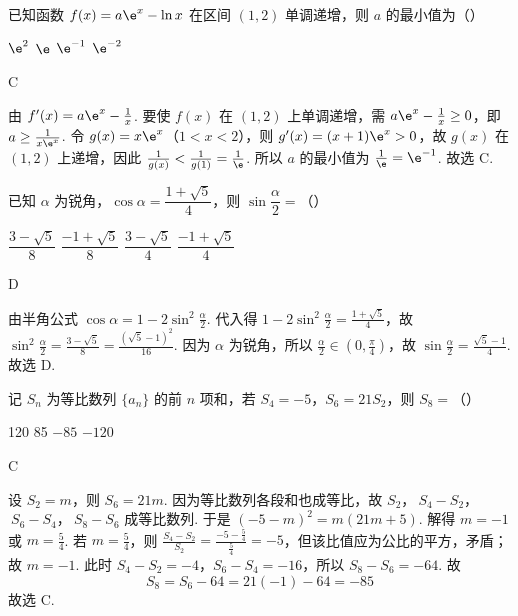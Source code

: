 \begin{problem}
已知函数 \(f(x)=a\e^x-\ln x\) 在区间 \((1,2)\) 单调递增，则 \(a\) 的最小值为（\quad）

\choices
    {\(\e^2\)}
    {\(\e\)}
    {\(\e^{-1}\)}
    {\(\e^{-2}\)}
\end{problem}

\begin{answer}
C
\end{answer}

\begin{solution}
由 \(f'(x)=a\e^x-\frac1x\). 要使 \(f(x)\) 在 \((1,2)\) 上单调递增，需 \(a\e^x-\frac1x\ge0\)，即 \(a\ge\frac{1}{x\e^x}\). 令 \(g(x)=x\e^x\)（\(1<x<2\)），则 \(g'(x)=(x+1)\e^x>0\)，故 \(g(x)\) 在 \((1,2)\) 上递增，因此 \(\frac1{g(x)}<\frac1{g(1)}=\frac1{\e}\). 所以 \(a\) 的最小值为 \(\frac1{\e}=\e^{-1}\). 故选 C.
\end{solution}

\begin{problem}
已知 \(\alpha\) 为锐角，\(\cos\alpha=\dfrac{1+\sqrt5}{4}\)，则 \(\sin\dfrac{\alpha}{2}=\)（\quad）

\choices
    {\(\dfrac{3-\sqrt5}{8}\)}
    {\(\dfrac{-1+\sqrt5}{8}\)}
    {\(\dfrac{3-\sqrt5}{4}\)}
    {\(\dfrac{-1+\sqrt5}{4}\)}
\end{problem}

\begin{answer}
D
\end{answer}

\begin{solution}
由半角公式 \(\cos\alpha=1-2\sin^2\frac{\alpha}{2}\). 代入得 \(1-2\sin^2\frac{\alpha}{2}=\frac{1+\sqrt5}{4}\)，故 \(\sin^2\frac{\alpha}{2}=\frac{3-\sqrt5}{8}=\frac{(\sqrt5-1)^2}{16}\). 因为 \(\alpha\) 为锐角，所以 \(\frac{\alpha}{2}\in(0,\frac{\pi}{4})\)，故 \(\sin\frac{\alpha}{2}=\frac{\sqrt5-1}{4}\). 故选 D.
\end{solution}

\begin{problem}
记 \(S_n\) 为等比数列 \(\{a_n\}\) 的前 \(n\) 项和，若 \(S_4=-5\)，\(S_6=21S_2\)，则 \(S_8=\)（\quad）

\choices
    {120}
    {85}
    {\(-85\)}
    {\(-120\)}
\end{problem}

\begin{answer}
C
\end{answer}

\begin{solution}
设 \(S_2=m\)，则 \(S_6=21m\). 因为等比数列各段和也成等比，故 \(S_2\)，\(\ S_4-S_2\)，\(\ S_6-S_4\)，\(\ S_8-S_6\) 成等比数列. 于是 \((-5-m)^2=m(21m+5)\). 解得 \(m=-1\) 或 \(m=\frac54\). 若 \(m=\frac54\)，则
\(\frac{S_4-S_2}{S_2}=\frac{-5-\frac54}{\frac54}=-5\)，但该比值应为公比的平方，矛盾；故 \(m=-1\).
此时 \(S_4-S_2=-4\)，\(S_6-S_4=-16\)，所以 \(S_8-S_6=-64\). 故
\[
S_8=S_6-64=21(-1)-64=-85
\]
故选 C.
\end{solution}
